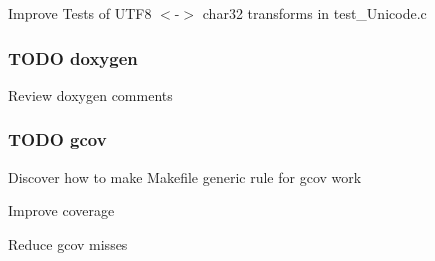 \begin{DoxyItemize}
\item Improve Tests of U\+T\+F8 $<$-\/$>$ char32 transforms in test\+\_\+\+Unicode.\+c
\end{DoxyItemize}

\subsubsection*{T\+O\+D\+O doxygen}


\begin{DoxyItemize}
\item Review doxygen comments
\end{DoxyItemize}

\subsubsection*{T\+O\+D\+O gcov}


\begin{DoxyItemize}
\item Discover how to make Makefile generic rule for gcov work
\item Improve coverage
\item Reduce gcov misses 
\end{DoxyItemize}